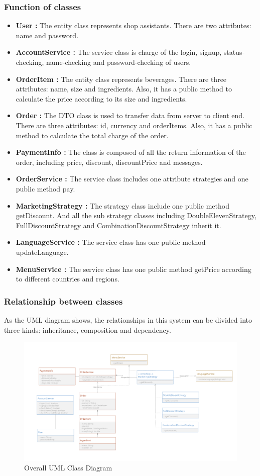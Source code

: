 \documentclass[a4paper]{report}
\begin{document}
\subsubsection{Function of classes}
\begin{itemize}
\item \textbf{User :} The entity class represents shop assistants. There are two attributes: name and password.
\item \textbf{AccountService :} The service class is charge of the login, signup, status-checking, name-checking and password-checking of users.
\item \textbf{OrderItem :} The entity class represents beverages. There are three attributes: name, size and ingredients. Also, it has a public method to calculate the price according to its size and ingredients.
\item \textbf{Order :} The DTO class is used to transfer data from server to client end. There are three attributes: id, currency and orderItems. Also, it has a public method to calculate the total charge of the order. 
\item \textbf{PaymentInfo :} The class is composed of all the return information of the order, including price, discount, discountPrice and messages.
\item \textbf{OrderService :} The service class includes one attribute strategies and one public method pay.
\item \textbf{MarketingStrategy :} The strategy class include one public method getDiscount. And all the  sub strategy classes including  DoubleElevenStrategy, FullDiscountStrategy and CombinationDiscountStrategy inherit it.
\item \textbf{LanguageService :} The service class has one public method updateLanguage.
\item \textbf{MenuService :} The service class has one public method getPrice according to different countries and regions.
\end{itemize}
\subsubsection{Relationship between classes}
As the UML diagram shows, the relationships in this system can be divided into three kinds: inheritance, composition and dependency.
\begin{figure}
  \centering
  \includegraphics[scale=0.44]{figure4.jpg}
  \caption{Overall UML Class Diagram}\label{2}
\end{figure}
\end{document}
